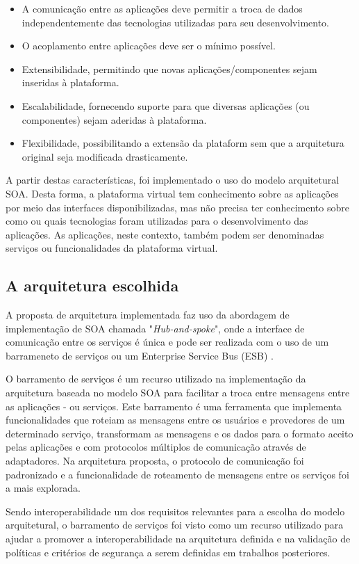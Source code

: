 \begin{itemize}
\item A comunicação entre as aplicações deve permitir a troca de dados independentemente das tecnologias utilizadas para seu desenvolvimento.
\item O acoplamento entre aplicações deve ser o mínimo possível.
\item Extensibilidade, permitindo que novas aplicações/componentes sejam inseridas à plataforma.
\item Escalabilidade, fornecendo suporte para que diversas aplicações (ou componentes) sejam aderidas à plataforma.
\item Flexibilidade,  possibilitando a extensão da plataform sem que a arquitetura original seja modificada drasticamente.
\end{itemize}

A partir destas características, foi implementado o uso do modelo arquitetural SOA. Desta forma, a plataforma virtual tem conhecimento sobre as aplicações por meio das interfaces disponibilizadas, mas não precisa ter conhecimento sobre como ou quais tecnologias foram utilizadas para o desenvolvimento das aplicações. As aplicações, neste contexto, também podem ser denominadas serviços ou funcionalidades da plataforma virtual.

\subsection{A arquitetura escolhida}

A proposta de arquitetura implementada faz uso da abordagem de implementação de SOA chamada "\textit{Hub-and-spoke}", onde a interface de comunicação entre os serviços é única e pode ser realizada com o uso de um barrameneto de serviços ou um Enterprise Service Bus (ESB) \cite{Bianco2007}.

O barramento de serviços é um recurso utilizado na implementação da arquitetura baseada no modelo SOA para facilitar a troca entre mensagens entre as aplicações - ou serviços. Este barramento é uma ferramenta que implementa funcionalidades que roteiam as mensagens entre os usuários e provedores de um determinado serviço, transformam as mensagens e os dados para o formato aceito pelas aplicações e com protocolos múltiplos de comunicação através de adaptadores. Na arquitetura proposta, o protocolo de comunicação foi padronizado e a funcionalidade de roteamento de mensagens entre os serviços foi a mais explorada.

Sendo interoperabilidade um dos requisitos relevantes para a escolha do modelo arquitetural, o barramento de serviços foi visto como um recurso utilizado para ajudar a promover a interoperabilidade na arquitetura definida e na validação de políticas e critérios de segurança a serem definidas em trabalhos posteriores.

